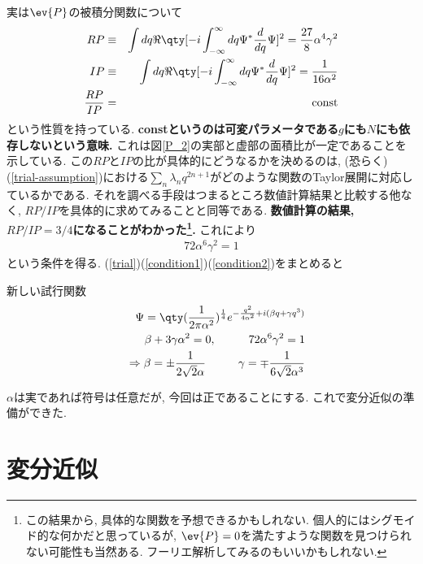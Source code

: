 \documentclass[10.5pt,a4paper]{jreport}
\begin{document}
実は$\ev{P}$の被積分関数について
\begin{eqnarray}
  RP &\equiv& \int dq \Re\qty[-i\int_{-\infty}^{\infty} dq \Psi^*\frac{d}{dq}\Psi]^2 = \frac{27}{8}\alpha^4\gamma^2\\
  IP &\equiv& \int dq \Re\qty[-i\int_{-\infty}^{\infty} dq \Psi^*\frac{d}{dq}\Psi]^2= \frac{1}{16\alpha^2}\\
  \frac{RP}{IP} &=& {\rm const}
\end{eqnarray}
という性質を持っている.\textbf{ constというのは可変パラメータである$g$にも$N$にも依存しないという意味.} これは図\ref{P_2}の実部と虚部の面積比が一定であることを示している. この$RP$と$IP$の比が具体的にどうなるかを決めるのは, (恐らく)(\ref{trial-assumption})における$\sum_n \lambda_nq^{2n+1}$がどのような関数のTaylor展開に対応しているかである. それを調べる手段はつまるところ数値計算結果と比較する他なく, $RP/IP$を具体的に求めてみることと同等である. \textbf{数値計算の結果, $RP/IP=3/4$になることがわかった\footnote{この結果から, 具体的な関数を予想できるかもしれない. 個人的にはシグモイド的な何かだと思っているが, $\ev{P}=0$を満たすような関数を見つけられない可能性も当然ある. フーリエ解析してみるのもいいかもしれない. }.} これにより
\begin{eqnarray}
  72\alpha^6\gamma^2 = 1\label{condition2}
\end{eqnarray}
という条件を得る. (\ref{trial})(\ref{condition1})(\ref{condition2})をまとめると
\begin{itembox}[c]{新しい試行関数}
\begin{eqnarray}
  &&\Psi = \qty(\frac{1}{2\pi\alpha^2})^\frac14e^{-\frac{q^2}{4\alpha^2} + i(\beta q + \gamma q^3)}\label{new-trial}\\
  &&\beta + 3\gamma\alpha^2 = 0,\hspace{1cm} 72\alpha^6\gamma^2 = 1 \label{conditions}\\
  &&\Rightarrow \beta = \pm\frac{1}{2\sqrt{2}\alpha}\hspace{1cm}\gamma = \mp\frac{1}{6\sqrt{2}\alpha^3}
\end{eqnarray}
\end{itembox}
$\alpha$は実であれば符号は任意だが, 今回は正であることにする. これで変分近似の準備ができた.
\section{変分近似}
\end{document}
